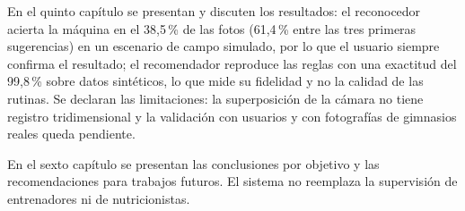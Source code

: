 En el quinto capítulo se presentan y discuten los resultados: el reconocedor
acierta la máquina en el 38,5\,\% de las fotos (61,4\,\% entre las tres primeras
sugerencias) en un escenario de campo simulado, por lo que el usuario siempre
confirma el resultado; el recomendador reproduce las reglas con una exactitud
del 99,8\,\% sobre datos sintéticos, lo que mide su fidelidad y no la calidad de
las rutinas. Se declaran las limitaciones: la superposición de la cámara no
tiene registro tridimensional y la validación con usuarios y con fotografías de
gimnasios reales queda pendiente.

En el sexto capítulo se presentan las conclusiones por objetivo y las
recomendaciones para trabajos futuros. El sistema no reemplaza la supervisión
de entrenadores ni de nutricionistas.
\normalsize
